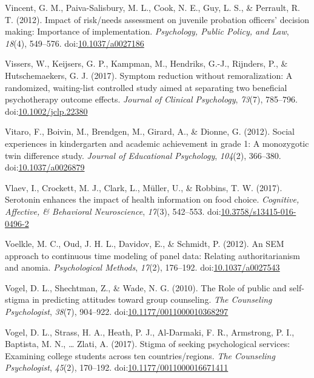 \documentclass[english,man]{apa6}
\begin{document}
\hypertarget{ref-Vincent2012}{}
Vincent, G. M., Paiva-Salisbury, M. L., Cook, N. E., Guy, L. S., \&
Perrault, R. T. (2012). Impact of risk/needs assessment on juvenile
probation officers' decision making: Importance of implementation.
\emph{Psychology, Public Policy, and Law}, \emph{18}(4), 549--576.
doi:\href{https://doi.org/10.1037/a0027186}{10.1037/a0027186}

\hypertarget{ref-Vissers2017}{}
Vissers, W., Keijsers, G. P., Kampman, M., Hendriks, G.-J., Rijnders,
P., \& Hutschemaekers, G. J. (2017). Symptom reduction without
remoralization: A randomized, waiting-list controlled study aimed at
separating two beneficial psychotherapy outcome effects. \emph{Journal
of Clinical Psychology}, \emph{73}(7), 785--796.
doi:\href{https://doi.org/10.1002/jclp.22380}{10.1002/jclp.22380}

\hypertarget{ref-Vitaro2012}{}
Vitaro, F., Boivin, M., Brendgen, M., Girard, A., \& Dionne, G. (2012).
Social experiences in kindergarten and academic achievement in grade 1:
A monozygotic twin difference study. \emph{Journal of Educational
Psychology}, \emph{104}(2), 366--380.
doi:\href{https://doi.org/10.1037/a0026879}{10.1037/a0026879}

\hypertarget{ref-Vlaev2017}{}
Vlaev, I., Crockett, M. J., Clark, L., Müller, U., \& Robbins, T. W.
(2017). Serotonin enhances the impact of health information on food
choice. \emph{Cognitive, Affective, \& Behavioral Neuroscience},
\emph{17}(3), 542--553.
doi:\href{https://doi.org/10.3758/s13415-016-0496-2}{10.3758/s13415-016-0496-2}

\hypertarget{ref-Voelkle2012}{}
Voelkle, M. C., Oud, J. H. L., Davidov, E., \& Schmidt, P. (2012). An
SEM approach to continuous time modeling of panel data: Relating
authoritarianism and anomia. \emph{Psychological Methods}, \emph{17}(2),
176--192. doi:\href{https://doi.org/10.1037/a0027543}{10.1037/a0027543}

\hypertarget{ref-Vogel2010}{}
Vogel, D. L., Shechtman, Z., \& Wade, N. G. (2010). The Role of public
and self-stigma in predicting attitudes toward group counseling.
\emph{The Counseling Psychologist}, \emph{38}(7), 904--922.
doi:\href{https://doi.org/10.1177/0011000010368297}{10.1177/0011000010368297}

\hypertarget{ref-Vogel2017}{}
Vogel, D. L., Strass, H. A., Heath, P. J., Al-Darmaki, F. R., Armstrong,
P. I., Baptista, M. N., \ldots{} Zlati, A. (2017). Stigma of seeking
psychological services: Examining college students across ten
countries/regions. \emph{The Counseling Psychologist}, \emph{45}(2),
170--192.
doi:\href{https://doi.org/10.1177/0011000016671411}{10.1177/0011000016671411}
\end{document}
